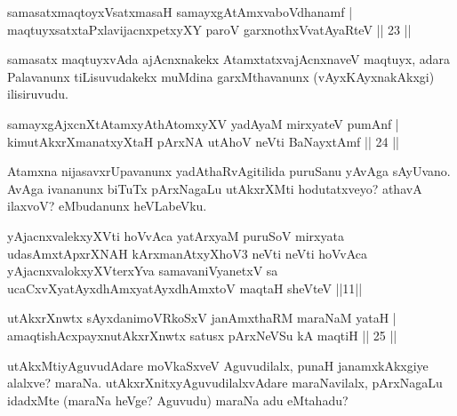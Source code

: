 
\begin{shl}
samasatxmaqtoyxVsatxmasaH samayxgAtAmxvaboVdhanamf |\\
maqtuyxsatxtaPxlavijacnxpetxyXY paroV garxnothxV\s vatAyaRteV \hfill || 23 ||
\end{shl}

\begin{artha}
samasatx maqtuyxvAda ajAcnxnakekx AtamxtatxvajAcnxnaveV maqtuyx, adara Palavanunx tiLisuvudakekx muMdina garxMthavanunx (vAyxKAyxnakAkxgi) ilisiruvudu.
\end{artha}


\begin{shl}
samayxgAjxcnXtAtamxyAthAtomxyXV yadA\s yaM mirxyateV pumAnf |\\
kimutAkxrXmanatxyXtaH pArxNA utAhoV neVti BaNayxtAmf \hfill || 24 ||
\end{shl}

\begin{artha}
Atamxna nijasavxrUpavanunx yadAthaRvAgitilida puruSanu yAvAga sAyUvano. AvAga ivananunx 
biTuTx pArxNagaLu utAkxrXMti hodutatxveyo? athavA ilaxvoV? eMbudanunx heVLabeVku.
\end{artha}


\begin{shl}
yAjacnxvalekxyXVti hoVvAca yatArxyaM puruSoV mirxyata udasAmxtApxrXNAH kArxmanAtxyXhoV3 neVti neVti hoVvAca yAjacnxvalokxyXV\s terxYva samavaniVyanetxV sa ucaCxvXyatAyxdhAmxyatAyxdhAmxtoV maqtaH sheVteV ||11||
\end{shl}


\begin{shl}
utAkxrXnwtx sAyxdanimoVRkoSxV janAmxthaRM maraNaM yataH |\\
amaqtishAcxpayxnutAkxrXnwtx satusx pArxNeVSu kA maqtiH \hfill || 25 ||
\end{shl}

\begin{artha}
utAkxMtiyAguvudAdare moVkaSxveV Aguvudilalx, punaH janamxkAkxgiye alalxve? maraNa. 
utAkxrXnitxyAguvudilalxvAdare maraNavilalx, pArxNagaLu idadxMte (maraNa heVge? Aguvudu) 
maraNa adu eMtahadu?
\end{artha}

